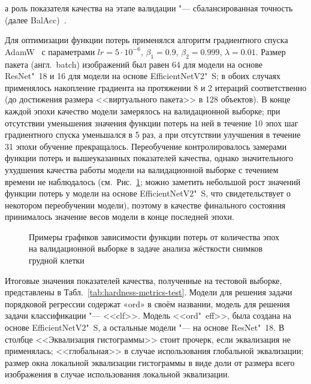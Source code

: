 \noindent а роль показателя качества на этапе валидации "--- сбалансированная точность (далее BalAcc)~\cite{brodersen2010balanced}.

Для оптимизации функции потерь применялся алгоритм градиентного спуска AdamW~\cite{loshchilov2018decoupled} с параметрами $lr = 5 \cdot {10}^{-6}$, $\beta_1 = 0.9$, $\beta_2 = 0.999$, $\lambda = 0.01$. Размер пакета (англ.~batch) изображений был равен 64 для модели на основе ResNet"~18 и 16 для модели на основе EfficientNetV2"~S; в обоих случаях применялось накопление градиента на протяжении 8 и 2 итераций соответственно (до достижения размера <<виртуального пакета>> в 128 объектов). В конце каждой эпохи качество модели замерялось на валидационной выборке; при отсутствии уменьшения значения функции потерь на ней в течение 10 эпох шаг градиентного спуска уменьшался в 5 раз, а при отсутствии улучшения в течение 31 эпохи обучение прекращалось. Переобучение контролировалось замерами функции потерь и вышеуказанных показателей качества, однако значительного ухудшения качества работы модели на валидационной выборке с течением времени не наблюдалось (см.~Рис.~\ref{fig:val-losses}; можно заметить небольшой рост значений функции потерь у модели на основе EfficientNetV2"~S, что свидетельствует о некотором переобучении модели), поэтому в качестве финального состояния принималось значение весов модели в конце последней эпохи.

\begin{figure}[ht]
	\caption{Примеры графиков зависимости функции потерь от количества эпох на валидационной выборке в задаче анализа жёсткости снимков грудной клетки}
	\label{fig:val-losses}
\end{figure}

Итоговые значения показателей качества, полученные на тестовой выборке, представлены в Табл.~\ref{tab:hardness-metrics-test}. Модели для решения задачи порядковой регрессии содержат «ord» в своём названии, модель для решения задачи классификации "--- <<clf>>. Модель <<ord"~eff>>, была создана на основе EfficientNetV2"~S, а остальные модели "--- на основе ResNet"~18. В столбце <<Эквализация гистограммы>> стоит прочерк, если эквализация не применялась; <<глобальная>> в случае использования глобальной эквализации; размер окна локальной эквализации гистограммы в виде доли от размера всего изображения в случае использования локальной эквализации.


